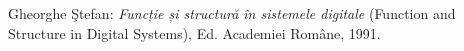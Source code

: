 {\begin{thebibliography}{}







  Gheorghe \c Stefan: {\em Funcție și structură în sistemele digitale} (Function and Structure in Digital Systems), Ed. Academiei Române, 1991.





\end{thebibliography}}
